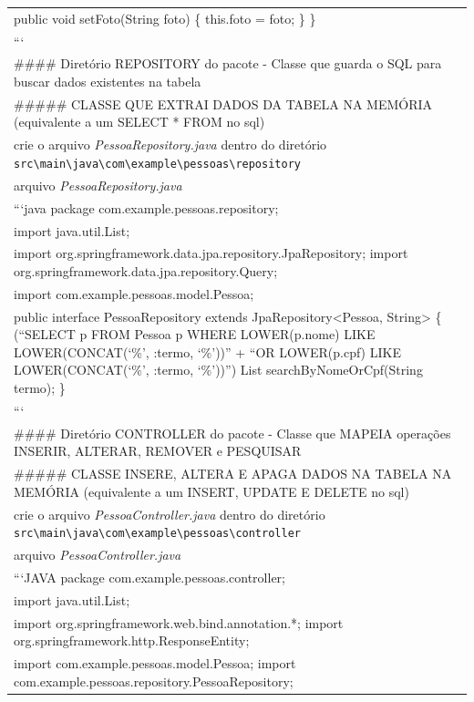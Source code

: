 \documentclass[
]{book}
\begin{document}
\begin{longtable}[]{@{}
  >{\raggedright\arraybackslash}p{}@{}}
public void setFoto(String foto) \{ this.foto = foto; \}
\} \\
``` \\
\#\#\#\# Diretório REPOSITORY do pacote - Classe que guarda o SQL para buscar dados existentes na tabela \\
\#\#\#\#\# CLASSE QUE EXTRAI DADOS DA TABELA NA MEMÓRIA (equivalente a um SELECT * FROM no sql) \\
crie o arquivo \emph{PessoaRepository.java} dentro do diretório \texttt{src\textbackslash{}main\textbackslash{}java\textbackslash{}com\textbackslash{}example\textbackslash{}pessoas\textbackslash{}repository} \\
arquivo \emph{PessoaRepository.java} \\
```java
package com.example.pessoas.repository; \\
import java.util.List; \\
import org.springframework.data.jpa.repository.JpaRepository;
import org.springframework.data.jpa.repository.Query; \\
import com.example.pessoas.model.Pessoa; \\
public interface PessoaRepository extends JpaRepository\textless Pessoa, String\textgreater{}
\{
\citet{Query}(``SELECT p FROM Pessoa p WHERE LOWER(p.nome) LIKE LOWER(CONCAT(`\%', :termo, `\%'))'' +
``OR LOWER(p.cpf) LIKE LOWER(CONCAT(`\%', :termo, `\%'))'')
List searchByNomeOrCpf(String termo);
\} \\
``` \\
\#\#\#\# Diretório CONTROLLER do pacote - Classe que MAPEIA operações INSERIR, ALTERAR, REMOVER e PESQUISAR \\
\#\#\#\#\# CLASSE INSERE, ALTERA E APAGA DADOS NA TABELA NA MEMÓRIA (equivalente a um INSERT, UPDATE E DELETE no sql) \\
crie o arquivo \emph{PessoaController.java} dentro do diretório \texttt{src\textbackslash{}main\textbackslash{}java\textbackslash{}com\textbackslash{}example\textbackslash{}pessoas\textbackslash{}controller} \\
arquivo \emph{PessoaController.java} \\
```JAVA
package com.example.pessoas.controller; \\
import java.util.List; \\
import org.springframework.web.bind.annotation.*;
import org.springframework.http.ResponseEntity; \\
import com.example.pessoas.model.Pessoa;
import com.example.pessoas.repository.PessoaRepository; \\

\end{longtable}
\end{document}
